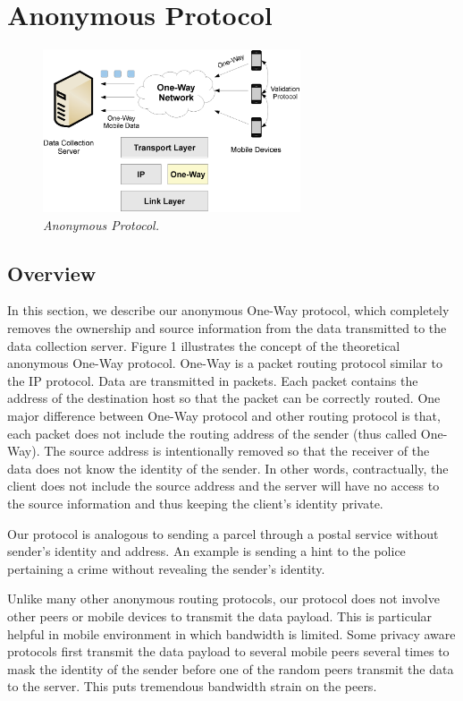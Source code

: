 \section{Anonymous Protocol}\label{sec-protocol}

\begin{figure}[h]
\begin{center}
\includegraphics[width=3in]{figure1.eps}
\caption{\small \sl Anonymous Protocol.\label{fig:Stupendous}}
\end{center}
\end{figure}

\subsection{Overview}\label{proto-overview}
In this section, we describe our anonymous One-Way protocol, which completely
removes the ownership and
source information from the data transmitted to the data collection server.
Figure 1 illustrates the concept of the theoretical anonymous One-Way
protocol. One-Way is a packet routing protocol similar to the IP protocol.
Data are transmitted in packets. Each packet contains the address of the destination
host so that the packet can be correctly routed. One major difference between
One-Way protocol and other routing protocol is that, each packet does not
include the routing address of the sender (thus called One-Way). The source
address is intentionally removed so that the receiver of the data does not
know the identity of the sender. In other
words, contractually, the client does not include the source address and the
server will have no access to the source information and thus keeping the
client's identity private.

Our protocol is analogous to sending a parcel through a postal service without
sender's identity and address. An example is sending a hint to the police
pertaining a crime without revealing the sender's identity.

Unlike many other anonymous routing protocols, our protocol does not involve other
peers or mobile devices to transmit the data payload. This is particular helpful
in mobile environment in which bandwidth is limited. Some privacy aware protocols
first transmit the data payload to several mobile peers several times to mask
the identity of the sender before one of the random peers transmit the data to
the server. This puts tremendous bandwidth strain on the peers.

